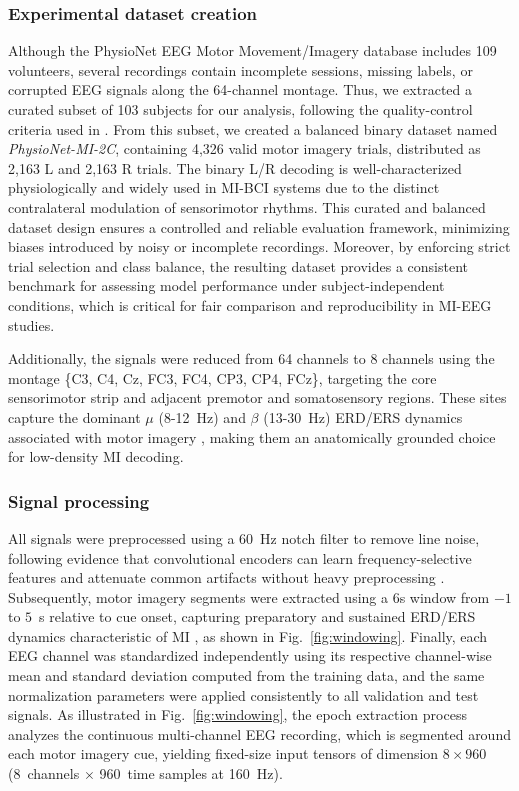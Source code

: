 \documentclass[a4paper,fleqn]{cas-dc}
\begin{document}
\subsubsection{Experimental dataset creation}
Although the PhysioNet EEG Motor Movement/Imagery database includes 109 volunteers, several recordings contain incomplete sessions, missing labels, or corrupted EEG signals along the 64-channel montage. Thus, we extracted a curated subset of 103 subjects for our analysis, following the quality-control criteria used in \citep{fukushima2024spatiotemporal}. From this subset, we created a balanced binary dataset named \textit{PhysioNet-MI-2C}, containing 4,326 valid motor imagery trials, distributed as 2,163 L and 2,163 R trials. 
The binary L/R decoding is well-characterized physiologically and widely used in MI-BCI systems due to the distinct contralateral modulation of sensorimotor rhythms. This curated and balanced dataset design ensures a controlled and reliable evaluation framework, minimizing biases introduced by noisy or incomplete recordings. Moreover, by enforcing strict trial selection and class balance, the resulting dataset provides a consistent benchmark for assessing model performance under subject-independent conditions, which is critical for fair comparison and reproducibility in MI-EEG studies.

Additionally, the signals were reduced from 64 channels to 8 channels using the montage \{C3, C4, Cz, FC3, FC4, CP3, CP4, FCz\}, targeting the core sensorimotor strip and adjacent premotor and somatosensory regions. These sites capture the dominant $\mu$ (8-12~Hz) and $\beta$ (13-30~Hz) ERD/ERS dynamics associated with motor imagery \citep{tsuchimoto2021use}, making them an anatomically grounded choice for low-density MI decoding.

\subsubsection{Signal processing}
All signals were preprocessed using a 60~Hz notch filter to remove line noise, following evidence that convolutional encoders can learn frequency-selective features and attenuate common artifacts without heavy preprocessing \citep{9lawhern2018eegnet,widmann2015digital}. Subsequently, motor imagery segments were extracted using a 6s window from $-1$ to $5$~s relative to cue onset, capturing preparatory and sustained ERD/ERS dynamics characteristic of MI \citep{tibor2017deep}, as shown in Fig.~\ref{fig:windowing}. Finally, each EEG channel was standardized independently using its respective channel-wise mean and standard deviation computed from the training data, and the same normalization parameters were applied consistently to all validation and test signals. As illustrated in Fig.~\ref{fig:windowing}, the epoch extraction process analyzes the continuous multi-channel EEG recording, which is segmented around each motor imagery cue, yielding fixed-size input tensors of dimension $8 \times 960$ (8~channels $\times$ 960~time samples at 160~Hz). 
\end{document}
